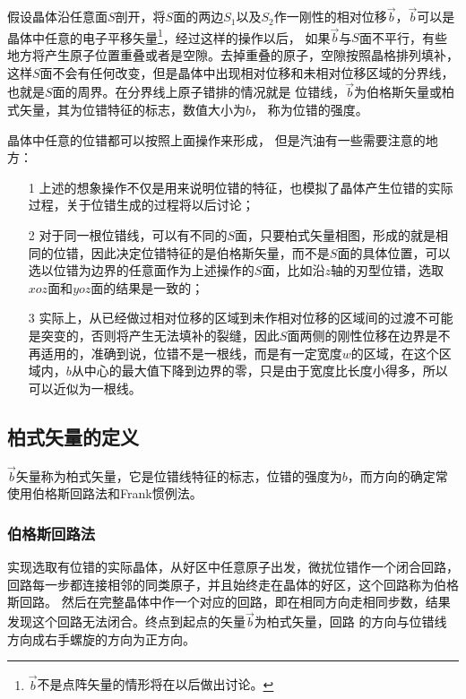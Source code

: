                 假设晶体沿任意面$S$剖开，将$S$面的两边$S_1$以及$S_2$作一刚性的相对位移$\vec{b}$，$\vec{b}$可以是
                晶体中任意的电子平移矢量\footnote{$\vec{b}$不是点阵矢量的情形将在以后做出讨论。}，经过这样的操作以后，
                如果$\vec{b}$与$S$面不平行，有些地方将产生原子位置重叠或者是空隙。去掉重叠的原子，空隙按照晶格排列填补，
                这样$S$面不会有任何改变，但是晶体中出现相对位移和未相对位移区域的分界线，也就是$S$面的周界。在分界线上原子错排的情况就是
                位错线，$\vec{b}$为伯格斯矢量或柏式矢量，其为位错特征的标志，数值大小为$b$，
                称为位错的强度。

                晶体中任意的位错都可以按照上面操作来形成， 但是汽油有一些需要注意的地方：
                \begin{itemize}
                    \item[1] 上述的想象操作不仅是用来说明位错的特征，也模拟了晶体产生位错的实际过程，关于位错生成的过程将以后讨论；
                    \item[2] 对于同一根位错线，可以有不同的$S$面，只要柏式矢量相图，形成的就是相同的位错，因此决定位错特征的是伯格斯矢量，而不是$S$面的具体位置，可以选以位错为边界的任意面作为上述操作的$S$面，比如沿$z$轴的刃型位错，选取$xoz$面和$yoz$面的结果是一致的；
                    \item[3] 实际上，从已经做过相对位移的区域到未作相对位移的区域间的过渡不可能是突变的，否则将产生无法填补的裂缝，因此$S$面两侧的刚性位移在边界是不再适用的，准确到说，位错不是一根线，而是有一定宽度$w$的区域，在这个区域内，$b$从中心的最大值下降到边界的零，只是由于宽度比长度小得多，所以可以近似为一根线。
                \end{itemize}
    
                \subsection{柏式矢量的定义}
                    $\vec{b}$矢量称为柏式矢量，它是位错线特征的标志，位错的强度为$b$，而方向的确定常使用伯格斯回路法和Frank惯例法。
                    \subsubsection{伯格斯回路法}
                        实现选取有位错的实际晶体，从好区中任意原子出发，微扰位错作一个闭合回路，回路每一步都连接相邻的同类原子，并且始终走在晶体的好区，这个回路称为伯格斯回路。
                        然后在完整晶体中作一个对应的回路，即在相同方向走相同步数，结果发现这个回路无法闭合。终点到起点的矢量$\vec{b}$为柏式矢量，回路
                        的方向与位错线方向成右手螺旋的方向为正方向。

